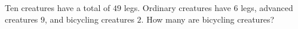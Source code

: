 Ten creatures have a total of $49$ legs. Ordinary creatures have $6$ legs, advanced creatures $9$, and bicycling creatures $2$. How many are bicycling creatures?

